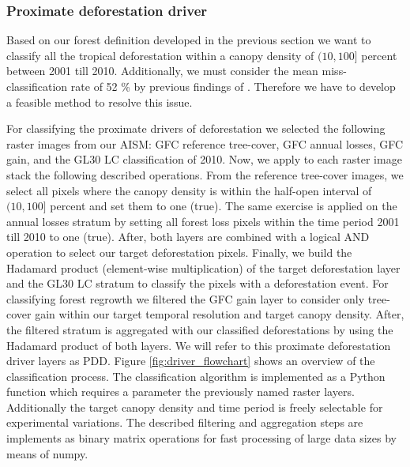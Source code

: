 		\subsubsection{Proximate deforestation driver}
			Based on our forest definition developed in the previous section we want to classify all the tropical deforestation within a canopy density of $(10,100]$ percent between 2001 till 2010. Additionally, we must consider the mean miss-classification rate of 52 \% by previous findings of \citeauthor{Seydewitz2017} \citep{Seydewitz2017}. Therefore we have to develop a feasible method to resolve this issue.

			For classifying the proximate drivers of deforestation we selected the following raster images from our \ac{AISM}: \ac{GFC} reference tree-cover, \ac{GFC} annual losses, \ac{GFC} gain, and the \ac{GL30} \ac{LC} classification of 2010. Now, we apply to each raster image stack the following described operations. From the reference tree-cover images, we select all pixels where the canopy density is within the half-open interval of $(10,100]$ percent and set them to one (true). The same exercise is applied on the annual losses stratum by setting all forest loss pixels within the time period 2001 till 2010 to one (true). After, both layers are combined with a logical AND operation to select our target deforestation pixels. Finally, we build the Hadamard product (element-wise multiplication) of the target deforestation layer and the \ac{GL30} \ac{LC} stratum to classify the pixels with a deforestation event. For classifying forest regrowth we filtered the \ac{GFC} gain layer to consider only tree-cover gain within our target temporal resolution and target canopy density. After, the filtered stratum is aggregated with our classified deforestations by using the Hadamard product of both layers. We will refer to this proximate deforestation driver layers as PDD. Figure \ref{fig:driver_flowchart} shows an overview of the classification process. The classification algorithm is implemented as a Python function which requires a parameter the previously named raster layers. Additionally the target canopy density and time period is freely selectable for experimental variations. The described filtering and aggregation steps are implements as binary matrix operations for fast processing of large data sizes by means of numpy.
